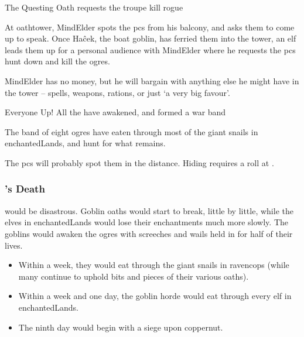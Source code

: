 \begin{multicols}{2}

{The Questing Oath}%
{ requests the troupe kill rogue }%

At \gls{oathtower}, \gls{MindElder} spots the \glspl{pc} from his balcony, and asks them to come up to speak.
Once Ha\^{c}ek, the boat goblin, has ferried them into the tower, an elf leads them up for a personal audience with \gls{MindElder} where he requests the \glspl{pc} hunt down and kill the \glspl{ogre}.

\Gls{MindElder} has no money, but he will bargain with anything else he might have in the tower -- \glspl{spell}, \glspl{weapon}, \glspl{ration}, or just `a very big favour'.

{Everyone Up!}%
{All the  have awakened, and formed a war band}%

The band of eight \glspl{ogre} have eaten through most of the giant snails in \gls{enchantedLands}, and hunt for what remains.



The \glspl{pc} will probably spot them in the distance.
Hiding requires a  roll at
\tn.

\label{lastOgreSegment}

\stopcontents[segments]

\subsubsection{'s Death}
would be disastrous.
Goblin oaths would start to break, little by little, while the elves in \gls{enchantedLands} would lose their enchantments much more slowly.
The goblins would awaken the \glspl{ogre} with screeches and wails held in for half of their lives.

\index{\expandafter\Glsfmtname{MindElder}'s Death}

\begin{itemize}
  \item
  Within a week, they would eat through the giant snails in \gls{ravencops} (while many continue to uphold bits and pieces of their various oaths).
  \item
  Within a week and one day, the goblin horde would eat through every elf in \gls{enchantedLands}.
  \item
  The ninth day would begin with a siege upon \gls{coppernut}.
\end{itemize}


\end{multicols}
